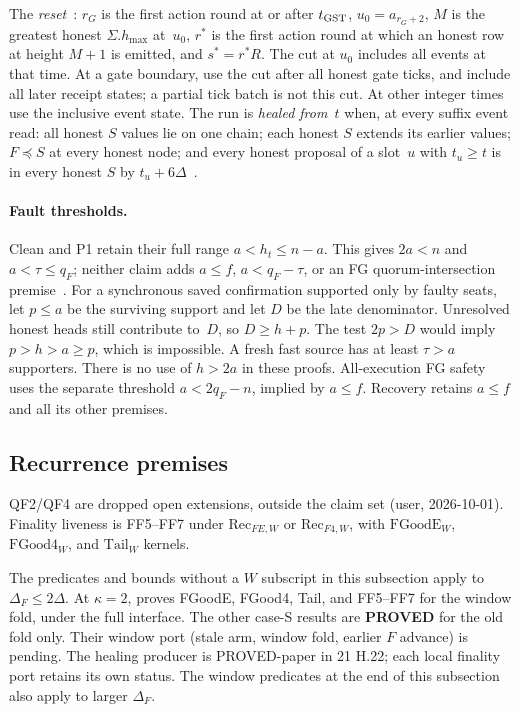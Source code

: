 \documentclass{article}
\theoremstyle{plain}
\theoremstyle{definition}
\theoremstyle{remark}
\newcommand{\hmax}{h_{\max}}
\newcommand{\PROVED}{\textbf{PROVED}}
\begin{document}
The \emph{reset}~\cite[H.11, H.22]{BPH}: $r_G$ is the first action round at
or after $t_{\rm GST}$, $u_0=a_{r_G+2}$, $M$ is the greatest honest
$\Sigma.\hmax$ at~$u_0$, $r^*$ is the first action round at which an
honest row at height $M+1$ is emitted, and $s^*=r^*R$.  The cut at $u_0$ includes all
events at that time.  At a gate boundary, use the cut after all honest
gate ticks, and include all later receipt states; a partial tick batch
is not this cut.  At other integer times use the inclusive event state.
The run is \emph{healed from~$t$} when, at every suffix event read:
all honest $S$ values lie on one chain; each
honest $S$ extends its earlier values; $F\preceq S$ at every honest
node; and every honest proposal of a slot~$u$ with $t_u\geq t$ is in
every honest $S$ by $t_u+6\Delta$~\cite[H.22]{BPH}.

\paragraph{Fault thresholds.}  Clean and P1 retain their full range
$a<h_t\leq n-a$.  This gives $2a<n$ and $a<\tau\leq q_F$; neither
claim adds $a\leq f$, $a<q_F-\tau$, or an FG quorum-intersection
premise~\cite[\S4]{FB}.  For a synchronous saved confirmation supported
only by faulty seats, let $p\leq a$ be the surviving support and let
$D$ be the late denominator.  Unresolved honest heads still contribute
to~$D$, so $D\geq h+p$.  The test $2p>D$ would imply $p>h>a\geq p$,
which is impossible.  A fresh fast source has at least $\tau>a$
supporters.  There is no use of $h>2a$ in these proofs.  All-execution
FG safety uses the separate threshold $a<2q_F-n$, implied by $a\leq f$.
Recovery retains $a\leq f$ and all its other premises.

\subsection{Recurrence premises}\label{sec:recurrence}

QF2/QF4 are dropped open extensions, outside the claim set (user, 2026-10-01).
Finality liveness is FF5--FF7 under $\mathrm{Rec}_{FE,W}$ or $\mathrm{Rec}_{F4,W}$,
with $\mathrm{FGoodE}_W$, $\mathrm{FGood4}_W$, and $\mathrm{Tail}_W$ kernels.

The predicates and bounds without a $W$ subscript in this subsection
apply to $\Delta_F\leq2\Delta$.  At $\kappa=2$, \cite[\S5]{FW} proves
FGoodE, FGood4, Tail, and FF5--FF7 for the window fold, under the
full interface.  The other case-S results are \PROVED{} for the old
fold only.  Their window port (stale arm, window fold, earlier $F$
advance) is pending.  The healing producer is PROVED-paper in 21 H.22; each local finality port retains its own status.
The window predicates at the end of this subsection also apply to
larger $\Delta_F$.
\end{document}
